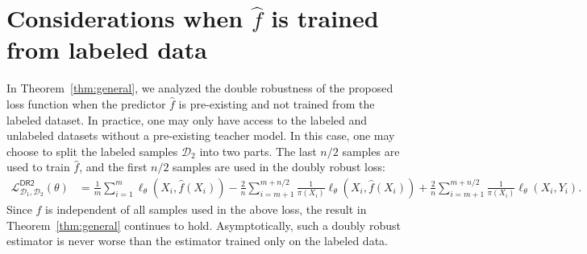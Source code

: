 \section{Considerations when $\hat f$ is trained from labeled data}\label{app:split}

In Theorem~\ref{thm:general}, we analyzed the double robustness of the proposed loss function when the predictor $\hat f$ is pre-existing and not trained from the labeled dataset. In practice, one may only have access to the labeled and unlabeled datasets without a pre-existing teacher model. In this case, one may choose to split the labeled samples $\mathcal{D}_2$ into two parts. The last  $n/2$ samples are used to  train $\hat f$, and the first $n/2$ samples are used in the doubly robust loss:
\begin{align*}
\mathcal{L}^{\mathsf{DR2}}_{\mathcal{D}_1,\mathcal{D}_2}(\theta) 
& = \frac{1}{m}  \sum_{i=1}^{m} \ell_\theta(X_i, \hat f(X_i)) -  \frac{2}{n} \sum_{i=m+1}^{m+n/2} \frac{1}{\pi(X_i)}\ell_\theta(X_i, \hat f(X_i))  + \frac{2}{n} \sum_{i=m+1}^{m+n/2} \frac{1}{\pi(X_i)}\ell_\theta(X_i, Y_i). 
\end{align*}
Since $\hat f$ is independent of all samples used in the above loss, the result in Theorem~\ref{thm:general} continues to hold. Asymptotically, such a doubly robust estimator is never worse than the estimator trained  only on the labeled data.
